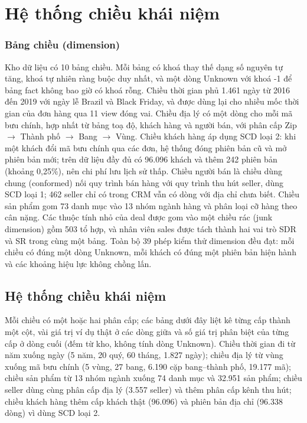 \section{Hệ thống chiều khái niệm}\label{sec:chieu}
\subsubsection*{Bảng chiều (dimension)}
Kho dữ liệu có 10 bảng chiều. Mỗi bảng có khoá thay thế dạng số nguyên tự tăng, khoá tự nhiên ràng buộc duy nhất, và một dòng Unknown với khoá -1 để bảng fact không bao giờ có khoá rỗng. Chiều thời gian  phủ 1.461 ngày từ 2016 đến 2019 với ngày lễ Brazil và Black Friday, và được dùng lại cho nhiều mốc thời gian của đơn hàng qua 11 view đóng vai. Chiều địa lý  có một dòng cho mỗi mã bưu chính, hợp nhất từ bảng toạ độ, khách hàng và người bán, với phân cấp Zip $\rightarrow$ Thành phố $\rightarrow$ Bang $\rightarrow$ Vùng. Chiều khách hàng  áp dụng SCD loại 2: khi một khách đổi mã bưu chính qua các đơn, hệ thống đóng phiên bản cũ và mở phiên bản mới; trên dữ liệu đầy đủ có 96.096 khách và thêm 242 phiên bản (khoảng 0,25\%), nên chi phí lưu lịch sử thấp. Chiều người bán  là chiều dùng chung (conformed) nối quy trình bán hàng với quy trình thu hút seller, dùng SCD loại 1; 462 seller chỉ có trong CRM vẫn có dòng với địa chỉ chưa biết. Chiều sản phẩm gom 73 danh mục vào 13 nhóm ngành hàng và phân loại cỡ hàng theo cân nặng. Các thuộc tính nhỏ của deal được gom vào một chiều rác (junk dimension) gồm 503 tổ hợp, và nhân viên sales được tách thành hai vai trò SDR và SR trong cùng một bảng. Toàn bộ 39 phép kiểm thử dimension đều đạt: mỗi chiều có đúng một dòng Unknown, mỗi khách có đúng một phiên bản hiện hành và các khoảng hiệu lực không chồng lấn.



\subsection{Hệ thống chiều khái niệm}\label{sec:he-thong-chieu}
Mỗi chiều có một hoặc hai phân cấp; các bảng dưới đây liệt kê từng cấp thành một cột, vài giá trị ví dụ thật ở các dòng giữa và số giá trị phân biệt của từng cấp ở dòng cuối (đếm từ kho, không tính dòng Unknown). Chiều thời gian đi từ năm xuống ngày (5 năm, 20 quý, 60 tháng, 1.827 ngày); chiều địa lý từ vùng xuống mã bưu chính (5 vùng, 27 bang, 6.190 cặp bang--thành phố, 19.177 mã); chiều sản phẩm từ 13 nhóm ngành xuống 74 danh mục và 32.951 sản phẩm; chiều seller dùng cùng phân cấp địa lý (3.557 seller) và thêm phân cấp kênh thu hút; chiều khách hàng thêm cấp khách thật (96.096) và phiên bản địa chỉ (96.338 dòng) vì dùng SCD loại 2.


